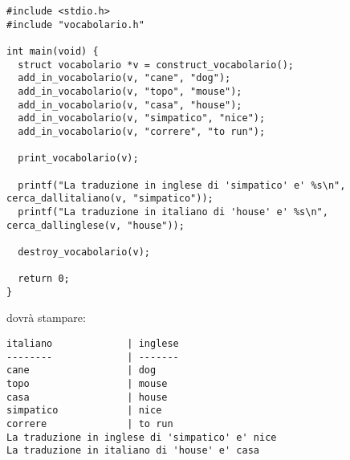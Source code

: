 \documentclass[italian,12pt]{article}
\begin{document}
{\scriptsize
\begin{verbatim}
#include <stdio.h>
#include "vocabolario.h"

int main(void) {
  struct vocabolario *v = construct_vocabolario();
  add_in_vocabolario(v, "cane", "dog");
  add_in_vocabolario(v, "topo", "mouse");
  add_in_vocabolario(v, "casa", "house");
  add_in_vocabolario(v, "simpatico", "nice");
  add_in_vocabolario(v, "correre", "to run");

  print_vocabolario(v);

  printf("La traduzione in inglese di 'simpatico' e' %s\n", cerca_dallitaliano(v, "simpatico"));
  printf("La traduzione in italiano di 'house' e' %s\n", cerca_dallinglese(v, "house"));

  destroy_vocabolario(v);

  return 0;
}
\end{verbatim}}

\noindent
dovr\`a stampare:

{\scriptsize
\begin{verbatim}
italiano             | inglese             
--------             | -------             
cane                 | dog                 
topo                 | mouse               
casa                 | house               
simpatico            | nice                
correre              | to run              
La traduzione in inglese di 'simpatico' e' nice
La traduzione in italiano di 'house' e' casa
\end{verbatim}}
\end{document}
